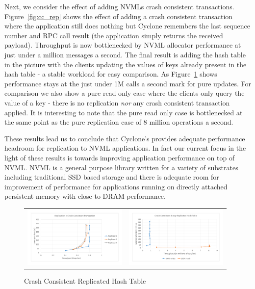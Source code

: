 \documentclass[letterpaper,twocolumn,10pt]{article}
\begin{document}
Next, we consider the effect of adding NVMLs crash consistent
transactions. Figure~\ref{fig:cc_rep} shows the effect of adding a crash
consistent transaction where the application still does nothing but Cyclone
remembers the last sequence number and RPC call result (the application simply
returns the received payload). Throughput is now bottlenecked by NVML allocator
performance at just under a million messages a second. The final result is
adding the hash table in the picture with the clients updating the values of
keys already present in the hash table - a stable workload for easy
comparison. As Figure~\ref{fig:app_rep} shows performance stays at the just
under 1M calls a second mark for pure updates. For comparison we also show a
pure read only case where the clients only query the value of a key - there is
no replication \emph{nor} any crash consistent transaction applied. It is
interesting to note that the pure read only case is bottlenecked at the same
point as the pure replication case of 8 million operations a second.

These results lead us to conclude that Cyclone's provides adequate performance
headroom for replication to NVML applications. In fact our current focus in the
light of these results is towards improving application performance on top of
NVML. NVML is a general purpose library written for a variety of substrates
including traditional SSD based storage and there is adequate room for
improvement of performance for applications running on directly attached
persistent memory with close to DRAM performance.

\begin{figure}
\begin{tabular}{cc}
\begin{minipage}{0.25\textwidth}
  \includegraphics[width=\textwidth,height=3cm]{results/cc_mops.pdf}
  \caption{Crash Consistency + Replication}
  \label{fig:cc_rep}
\end{minipage} &
\begin{minipage}{0.25\textwidth}
  \includegraphics[width=\textwidth,height=3cm]{results/app_mops.pdf}
  \caption{Crash Consistent Replicated Hash Table}
  \label{fig:app_rep}
\end{minipage}
\end{tabular}
\end{figure}
\end{document}
